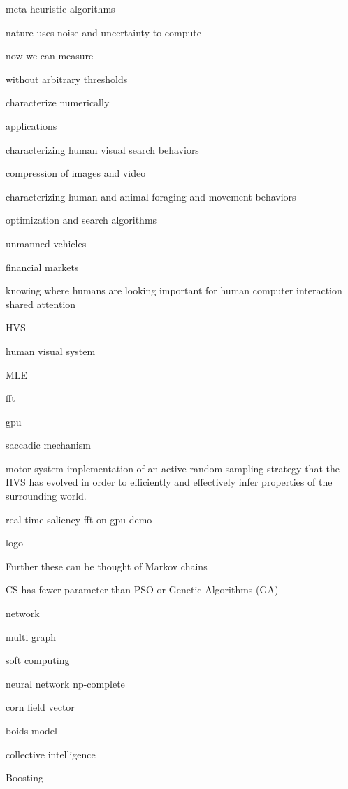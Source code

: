 \documentclass[8pt,journal,compsoc]{IEEEtran}
\begin{document}
meta heuristic algorithms

nature uses noise and uncertainty to compute 

now we can measure 

without arbitrary thresholds 
 
characterize numerically 

applications 

characterizing human visual search behaviors

compression of images and video 

characterizing human and animal foraging and movement behaviors 

optimization and search algorithms

unmanned vehicles 

financial markets


knowing where humans are looking important for human computer interaction shared attention 





HVS

human visual system





MLE

fft

gpu




 saccadic mechanism

motor system implementation of an active random sampling strategy that the HVS has evolved in order to efficiently and effectively infer properties of the surrounding world. 



real time saliency fft on gpu demo

logo





  
Further these can be thought of Markov chains

CS has fewer parameter than PSO or Genetic Algorithms (GA)

network 

multi graph 

soft computing 

neural network np-complete 

corn field vector 

boids model 

collective intelligence

Boosting 
\end{document}
